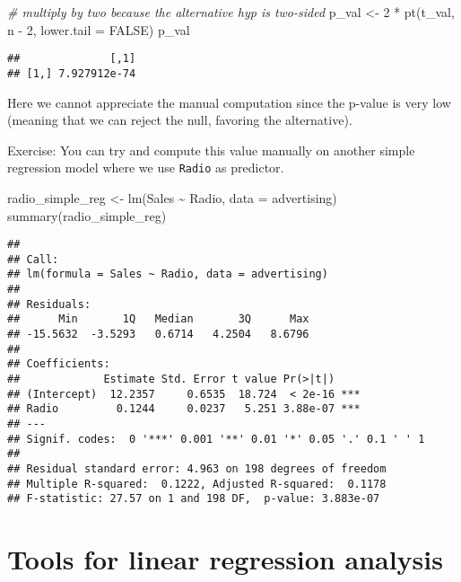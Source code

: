 \documentclass[
  oneside]{book}
\newenvironment{Shaded}{\begin{snugshade}}{\end{snugshade}}
\newcommand{\AttributeTok}[1]{\textcolor[rgb]{0.77,0.63,0.00}{#1}}
\newcommand{\CommentTok}[1]{\textcolor[rgb]{0.56,0.35,0.01}{\textit{#1}}}
\newcommand{\ConstantTok}[1]{\textcolor[rgb]{0.00,0.00,0.00}{#1}}
\newcommand{\DecValTok}[1]{\textcolor[rgb]{0.00,0.00,0.81}{#1}}
\newcommand{\FunctionTok}[1]{\textcolor[rgb]{0.00,0.00,0.00}{#1}}
\newcommand{\NormalTok}[1]{#1}
\newcommand{\OtherTok}[1]{\textcolor[rgb]{0.56,0.35,0.01}{#1}}
\newcommand{\SpecialCharTok}[1]{\textcolor[rgb]{0.00,0.00,0.00}{#1}}
\begin{document}
\begin{Shaded}
\begin{Highlighting}[]
\CommentTok{\# multiply by two because the alternative hyp is two{-}sided}
\NormalTok{p\_val }\OtherTok{\textless{}{-}} \DecValTok{2} \SpecialCharTok{*} \FunctionTok{pt}\NormalTok{(t\_val, n }\SpecialCharTok{{-}} \DecValTok{2}\NormalTok{, }\AttributeTok{lower.tail =} \ConstantTok{FALSE}\NormalTok{)}
\NormalTok{p\_val}
\end{Highlighting}
\end{Shaded}

\begin{verbatim}
##              [,1]
## [1,] 7.927912e-74
\end{verbatim}

Here we cannot appreciate the manual computation since the
p-value is very low (meaning that we can reject the null,
favoring the alternative).

Exercise: You can try and compute this value manually on another
simple regression model where we use \texttt{Radio} as predictor.

\begin{Shaded}
\begin{Highlighting}[]
\NormalTok{radio\_simple\_reg }\OtherTok{\textless{}{-}} \FunctionTok{lm}\NormalTok{(Sales }\SpecialCharTok{\textasciitilde{}}\NormalTok{ Radio, }\AttributeTok{data =}\NormalTok{ advertising)}
\FunctionTok{summary}\NormalTok{(radio\_simple\_reg)}
\end{Highlighting}
\end{Shaded}

\begin{verbatim}
## 
## Call:
## lm(formula = Sales ~ Radio, data = advertising)
## 
## Residuals:
##      Min       1Q   Median       3Q      Max 
## -15.5632  -3.5293   0.6714   4.2504   8.6796 
## 
## Coefficients:
##             Estimate Std. Error t value Pr(>|t|)    
## (Intercept)  12.2357     0.6535  18.724  < 2e-16 ***
## Radio         0.1244     0.0237   5.251 3.88e-07 ***
## ---
## Signif. codes:  0 '***' 0.001 '**' 0.01 '*' 0.05 '.' 0.1 ' ' 1
## 
## Residual standard error: 4.963 on 198 degrees of freedom
## Multiple R-squared:  0.1222, Adjusted R-squared:  0.1178 
## F-statistic: 27.57 on 1 and 198 DF,  p-value: 3.883e-07
\end{verbatim}

\hypertarget{tools-for-linear-regression-analysis}{%
\chapter{Tools for linear regression analysis}\label{tools-for-linear-regression-analysis}}
\end{document}
